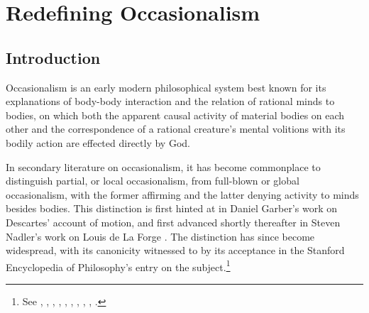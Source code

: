 %

%



\chapter{Redefining Occasionalism}
\section{Introduction}
Occasionalism is an early modern philosophical system best known for its explanations of body-body interaction and the relation of rational minds to bodies, on which both the apparent causal activity of material bodies on each other and the correspondence of a rational creature's mental volitions with its bodily action are effected directly by God. 

In secondary literature on occasionalism, it has become commonplace to distinguish partial, or local occasionalism, from full-blown or global occasionalism, with the former affirming and the latter denying activity to minds besides bodies. This distinction is first hinted at in Daniel Garber's work on Descartes' account of motion, and first advanced shortly thereafter in Steven Nadler's work on Louis de La Forge \autocite{Garber1987,Nadler1993b}. The distinction has since become widespread, with its canonicity witnessed to by its acceptance in the Stanford Encyclopedia of Philosophy's entry on the subject.\footnote{See \autocite{Radner1993}, \autocite{Clatterbaugh1996}, \autocite{Nadler1998}, \autocite{Clarke2000}, \autocite{Bardout2002}, \autocite{Nadler2005}, \autocite{Kolesnik2006}, \autocite{Lee2007}, \autocite{Sangiacomo2014}, \autocite{sep-occasionalism}.}

